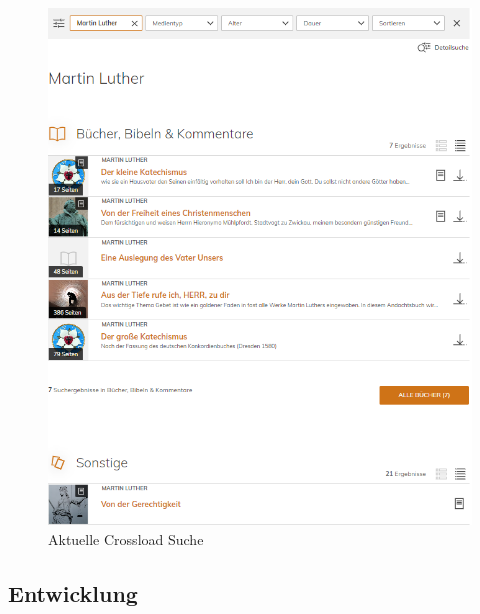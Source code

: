 \begin{figure}[ht!]
  \begin{centering}
    \includegraphics[width=.8\textwidth]{figures/appendix/crossloadSuche.png}
    \caption{Aktuelle Crossload Suche \cite{pfleiderer2022}}
    \label{fig:crossloadSuche}
  \end{centering}
\end{figure}




\clearpage
\subsection{Entwicklung}

